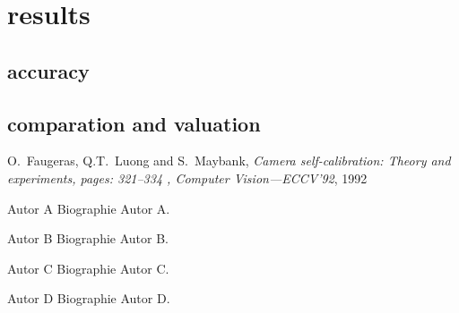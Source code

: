 \documentclass[journal,final,a4paper,twoside]{PS}
\begin{document}
\section{results}
\label{sec:results}
\subsection{accuracy}
\subsection{comparation and valuation}


\newpage

\begin{thebibliography}{1}
O.~Faugeras, Q.T.~Luong and S.~Maybank, \emph{{Camera self-calibration: Theory and experiments}, {pages: 321--334} , {Computer Vision---ECCV'92}}, 1992

\end{thebibliography}

\begin{biography}
{Autor A}
Biographie Autor A.
\end{biography}
\begin{biography}
{Autor B}
Biographie Autor B.
\end{biography}
\begin{biography}
{Autor C}
Biographie Autor C.

\end{biography}

\begin{biography}
{Autor D}
Biographie Autor D.

\end{biography}
\end{document}
